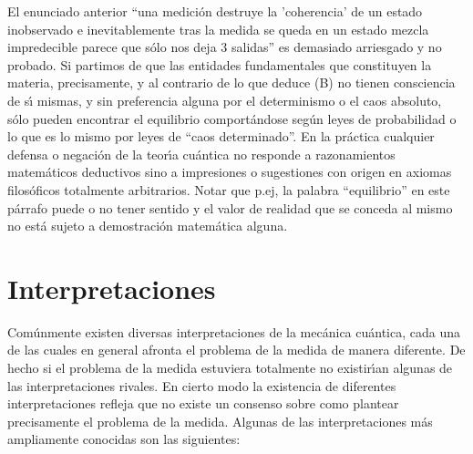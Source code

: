 \begin{enumerate}
El enunciado anterior ``una medici\'{o}n destruye la 'coherencia' de un estado inobservado e inevitablemente tras la medida se queda en un estado mezcla impredecible parece que s\'{o}lo nos deja 3 salidas'' es demasiado arriesgado y no probado. Si partimos de que las entidades fundamentales que constituyen la materia, precisamente, y al contrario de lo que deduce (B) no tienen consciencia de s\'{\i} mismas, y sin preferencia alguna por el determinismo o el caos absoluto, s\'{o}lo pueden encontrar el equilibrio comport\'{a}ndose seg\'{u}n leyes de probabilidad o lo que es lo mismo por leyes de ``caos determinado''. En la pr\'{a}ctica cualquier defensa o negaci\'{o}n de la teor\'{\i}a cu\'{a}ntica no responde a razonamientos matem\'{a}ticos deductivos sino a impresiones o sugestiones con origen en axiomas filos\'{o}ficos totalmente arbitrarios. Notar que p.ej, la palabra ``equilibrio'' en este p\'{a}rrafo puede o no tener sentido y el valor de realidad que se conceda al mismo no est\'{a} sujeto a demostraci\'{o}n matem\'{a}tica alguna.
\end{enumerate}


\section{Interpretaciones}
\label{S:interpretaciones}

Com\'{u}nmente existen diversas interpretaciones de la mec\'{a}nica cu\'{a}ntica, cada una de las cuales en general afronta el problema de la medida de manera diferente. De hecho si el problema de la medida estuviera totalmente no existir\'{\i}an algunas de las interpretaciones rivales. En cierto modo la existencia de diferentes interpretaciones refleja que no existe un consenso sobre como plantear precisamente el problema de la medida. Algunas de las interpretaciones m\'{a}s ampliamente conocidas son las siguientes:

